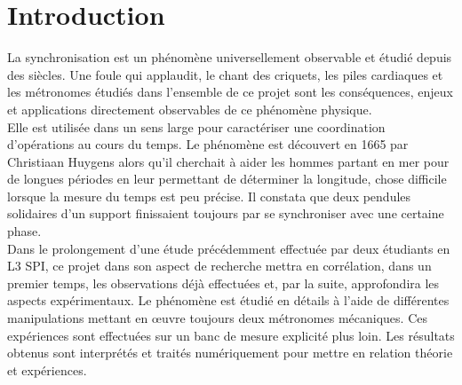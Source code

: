 \documentclass[a4paper,11pt]{report}
\begin{document}
\maketitle %
\newpage
{} \setcounter{page}{1} %
\newpage
\null
\thispagestyle{empty}
\newpage
{\tableofcontents}
\listoffigures
\newpage
\chapter*{Introduction}
 \setcounter{page}{1} %
	La synchronisation est un phénomène universellement observable et étudié depuis des siècles. Une foule qui applaudit, le chant des criquets, les piles cardiaques et les métronomes étudiés dans l'ensemble de ce projet sont les conséquences, enjeux et applications directement observables de ce phénomène physique.\\

	Elle est utilisée dans un sens large pour caractériser une coordination d'opérations au cours du temps. Le phénomène est découvert en 1665 par Christiaan Huygens alors qu'il cherchait à aider les hommes partant en mer pour de longues périodes en leur permettant de déterminer la longitude, chose difficile lorsque la mesure du temps est peu précise. Il constata que deux pendules solidaires d'un support finissaient toujours par se synchroniser avec une certaine phase.\\

	Dans le prolongement d'une étude précédemment effectuée par deux étudiants en L3 SPI, ce projet dans son aspect de recherche mettra en corrélation, dans un premier temps, les observations déjà effectuées et, par la suite, approfondira les aspects expérimentaux. Le phénomène est étudié en détails à l'aide de différentes manipulations mettant en œuvre toujours deux métronomes mécaniques. Ces expériences sont effectuées sur un banc de mesure explicité plus loin. Les résultats obtenus sont interprétés et traités numériquement pour mettre en relation théorie et expériences.
\end{document}
